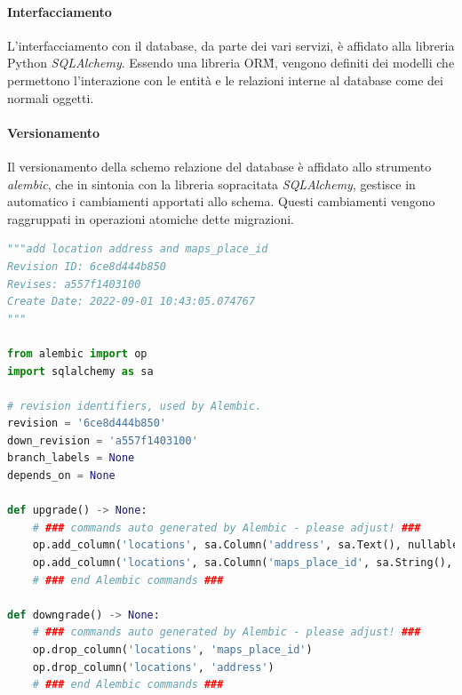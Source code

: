 \paragraph{Interfacciamento}\aCapo{}
L'interfacciamento con il database, da parte dei vari servizi, è affidato alla libreria Python \textit{SQLAlchemy}.
Essendo una libreria ORM\G{}, vengono definiti dei modelli che permettono l'interazione con le entità e le relazioni
interne al database come dei normali oggetti.

\paragraph{Versionamento}\aCapo{}
Il versionamento della schemo relazione del database è affidato allo strumento \textit{alembic}, che in
sintonia con la libreria sopracitata \textit{SQLAlchemy}, gestisce in automatico i cambiamenti apportati allo schema.
Questi cambiamenti vengono raggruppati in operazioni atomiche dette migrazioni.

\begin{lstlisting}[language=Python, caption=Esempio di migrazione autogenerata]
"""add location address and maps_place_id
Revision ID: 6ce8d444b850
Revises: a557f1403100
Create Date: 2022-09-01 10:43:05.074767
"""

from alembic import op
import sqlalchemy as sa

# revision identifiers, used by Alembic.
revision = '6ce8d444b850'
down_revision = 'a557f1403100'
branch_labels = None
depends_on = None

def upgrade() -> None:
    # ### commands auto generated by Alembic - please adjust! ###
    op.add_column('locations', sa.Column('address', sa.Text(), nullable=True))
    op.add_column('locations', sa.Column('maps_place_id', sa.String(), nullable=True))
    # ### end Alembic commands ###

def downgrade() -> None:
    # ### commands auto generated by Alembic - please adjust! ###
    op.drop_column('locations', 'maps_place_id')
    op.drop_column('locations', 'address')
    # ### end Alembic commands ###
\end{lstlisting}
